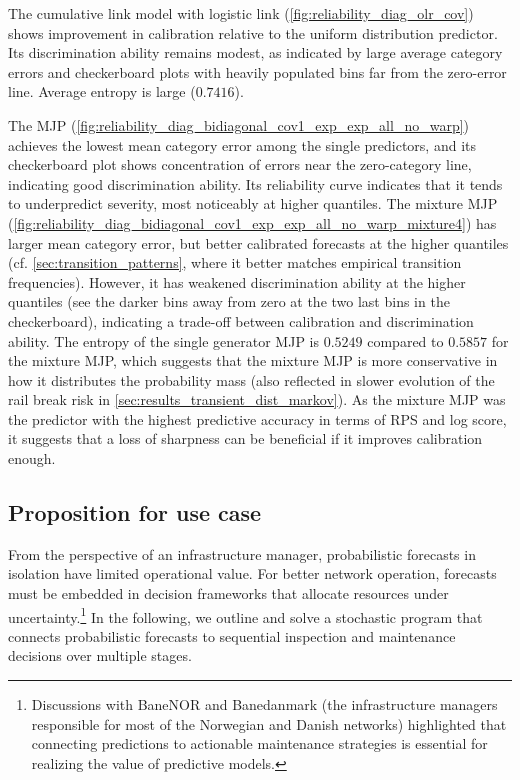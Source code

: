 \documentclass{article}
\begin{document}
The cumulative link model with logistic link (\cref{fig:reliability_diag_olr_cov}) shows improvement in calibration relative to the uniform distribution predictor.
Its discrimination ability remains modest, as indicated by large average category errors and checkerboard plots with heavily populated bins far from the zero-error line. Average entropy is large ($0.7416$).

The MJP (\cref{fig:reliability_diag_bidiagonal_cov1_exp_exp_all_no_warp}) achieves the lowest mean category error among the single predictors, and its checkerboard plot shows concentration of errors near the zero-category line, indicating good discrimination ability.
Its reliability curve indicates that it tends to underpredict severity, most noticeably at higher quantiles.
The mixture MJP (\cref{fig:reliability_diag_bidiagonal_cov1_exp_exp_all_no_warp_mixture4}) has larger mean category error, but better calibrated forecasts at the higher quantiles (cf. \cref{sec:transition_patterns}, where it better matches empirical transition frequencies). However, it has weakened discrimination ability at the higher quantiles (see the darker bins away from zero at the two last bins in the checkerboard), indicating a trade-off between calibration and discrimination ability.
The entropy of the single generator MJP is $0.5249$ compared to $0.5857$ for the mixture MJP, which suggests that the mixture MJP is more conservative in how it distributes the probability mass (also reflected in slower evolution of the rail break risk in \cref{sec:results_transient_dist_markov}). As the mixture MJP was the predictor with the highest predictive accuracy in terms of RPS and log score, it suggests that a loss of sharpness can be beneficial if it improves calibration enough.



\subsection{Proposition for use case} \label{sec:proposition_for_use}
From the perspective of an infrastructure manager, probabilistic forecasts in isolation have limited operational value. 
For better network operation, forecasts must be embedded in decision frameworks that allocate resources under uncertainty.\footnote{Discussions with BaneNOR and Banedanmark (the infrastructure managers responsible for most of the Norwegian and Danish networks) highlighted that connecting predictions to actionable maintenance strategies is essential for realizing the value of predictive models.}
In the following, we outline and solve a stochastic program that connects probabilistic forecasts to sequential inspection and maintenance decisions over multiple stages.
\end{document}
